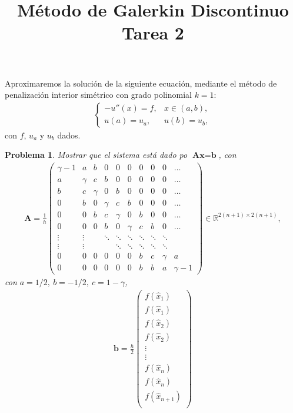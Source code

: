 \documentclass[10pt,a4paper]{report}
\title{\color{azul}\textbf{Método de Galerkin Discontinuo}\\
	\textbf{Tarea 2}}
\author{\color{azul}\autor}
\date{\color{azul}\fecha}
\newtheorem{pro}{Problema}
\begin{document}
	Aproximaremos la solución de la siguiente ecuación, mediante el método de penalización interior simétrico con grado polinomial $k = 1$:
	\begin{align}
		\left\{\begin{matrix}
			-u''(x) = f, &x\in (a,b),\\ 
			u(a) = u_{a}, &u(b) = u_{b},
		\end{matrix}\right.\label{eq:EDO}
	\end{align}
    con $f$, $u_{a}$ y $u_{b}$ dados.
	\begin{pro}
		Mostrar que el sistema está dado po $\textbf{A}\textbf{x} = \textbf{b}$, con
		\begin{align*}
			\textbf{A} = \frac{1}{h}\begin{pmatrix}
				\gamma -1 & a & b & 0 & 0 & 0 & 0 & 0 & 0 & \hdots \\ 
				a & \gamma & c & b & 0 & 0 & 0 & 0 & 0 & \hdots\\ 
				b & c & \gamma & 0 & b & 0 & 0 & 0 & 0 & \hdots\\ 
				0 & b & 0 & \gamma & c & b & 0 & 0 & 0 & \hdots\\ 
				0 & 0 & b & c & \gamma & 0 & b & 0 & 0 & \hdots\\ 
				0 & 0 & 0 & b & 0 & \gamma & c & b & 0 & \hdots\\ 
				\vdots & \vdots &  & \ddots & \ddots & \ddots & \ddots & \ddots & \ddots & \\ 
				\vdots & \vdots &  &  & \ddots & \ddots & \ddots & \ddots & \ddots & \\ 
				0 & 0 & 0 & 0 & 0 & 0 & b & c & \gamma & a\\ 
				0 & 0 & 0 & 0 & 0 & 0 & b & b & a & \gamma -1
			\end{pmatrix}\in \mathbb{R}^{2(n+1)\times 2(n+1)},
		\end{align*}
	con $a = 1/2,\ b = -1/2,\ c = 1-\gamma$,
	\begin{align*}
	\textbf{b} = \frac{h}{2}\begin{pmatrix}
		f(\hat{x}_{1})\\ 
		f(\hat{x}_{1})\\ 
		f(\hat{x}_{2})\\ 
		f(\hat{x}_{2})\\ 
		\vdots\\ 
		\vdots\\ 
		f(\hat{x}_{n})\\ 
		f(\hat{x}_{n})\\ 
		f(\hat{x}_{n+1})\\ 

\end{pmatrix}
\end{align*}
\end{pro}
\end{document}
